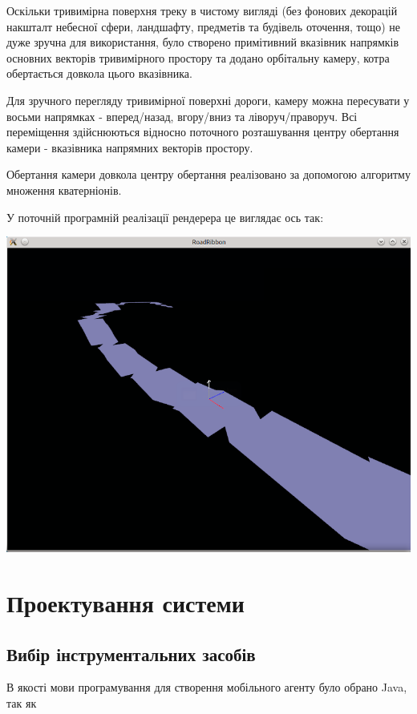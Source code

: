 \documentclass[simple,a4paper,14pt,ukrainian,utf8]{eskdtext}
\begin{document}
    Оскільки тривимірна поверхня треку в чистому вигляді (без фонових декорацій накшталт небесної сфери, ландшафту, предметів та будівель оточення, тощо) не дуже зручна для використання, було створено примітивний вказівник напрямків основних векторів тривимірного простору та додано орбітальну камеру, котра обертається довкола цього вказівника.
    
    Для зручного перегляду тривимірної поверхні дороги, камеру можна пересувати у восьми напрямках - вперед/назад, вгору/вниз та ліворуч/праворуч. Всі переміщення здійснюються відносно поточного розташування центру обертання камери - вказівника напрямних векторів простору.
    
    Обертання камери довкола центру обертання реалізовано за допомогою алгоритму множення кватерніонів.
    
    У поточній програмній реалізації рендерера це виглядає ось так:
    
    \vspace{3em}
    \includegraphics[scale=0.5]{images/camera1.png}
    
\newpage \section{Проектування системи}

    \subsection{Вибір інструментальних засобів}

        В якості мови програмування для створення мобільного агенту було обрано Java, так як
\end{document}
